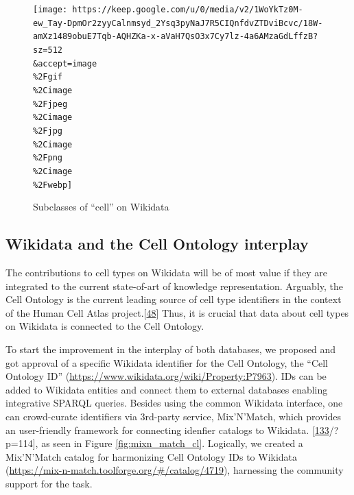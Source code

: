 \begin{figure}
\hypertarget{fig:subclass_of_cell}{%
\centering
\texttt{[image: https://keep.google.com/u/0/media/v2/1WoYkTz0M-ew\_Tay-DpmOr2zyyCalnmsyd\_2Ysq3pyNaJ7R5CIQnfdvZTDviBcvc/18W-amXz1489obuE7Tqb-AQHZKa-x-aVaH7QsO3x7Cy7lz-4a6AMzaGdLffzB?sz=512\\\&accept=image\\\%2Fgif\\\%2Cimage\\\%2Fjpeg\\\%2Cimage\\\%2Fjpg\\\%2Cimage\\\%2Fpng\\\%2Cimage\\\%2Fwebp]}
\caption{Subclasses of ``cell'' on Wikidata}\label{fig:subclass_of_cell}
}
\end{figure}

\hypertarget{wikidata-and-the-cell-ontology-interplay}{%
\subsection{Wikidata and the Cell Ontology interplay}\label{wikidata-and-the-cell-ontology-interplay}}

The contributions to cell types on Wikidata will be of most value if they are integrated to the current state-of-art of knowledge representation.
Arguably, the Cell Ontology is the current leading source of cell type identifiers in the context of the Human Cell Atlas project.{[}\protect\hyperlink{ref-qT8WxqjA}{48}{]}
Thus, it is crucial that data about cell types on Wikidata is connected to the Cell Ontology.

To start the improvement in the interplay of both databases, we proposed and got approval of a specific Wikidata identifier for the Cell Ontology, the ``Cell Ontology ID'' (\url{https://www.wikidata.org/wiki/Property:P7963}).
IDs can be added to Wikidata entities and connect them to external databases enabling integrative SPARQL queries.
Besides using the common Wikidata interface, one can crowd-curate identifiers via 3rd-party service, Mix'N'Match, which provides an user-friendly framework for connecting idenfier catalogs to Wikidata. {[}\protect\hyperlink{ref-JgiKEEdq}{133}/?p=114{]}, as seen in Figure \ref{fig:mixn_match_cl}.
Logically, we created a Mix'N'Match catalog for harmonizing Cell Ontology IDs to Wikidata (\url{https://mix-n-match.toolforge.org/\#/catalog/4719}), harnessing the community support for the task.

